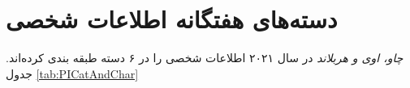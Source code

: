 

\section{دسته‌های هفتگانه اطلاعات شخصی}
\ifTheEffectsOfDifferentPersonalData
	\textit{چاو، اوی و هربلاند}
	در سال ۲۰۲۱ اطلاعات شخصی را در ۶ دسته طبقه بندی کرده‌اند.
	\citep{chuaEffectsDifferentPersonal2021}
	جدول
	\eqref{tab:PICatAndChar}
